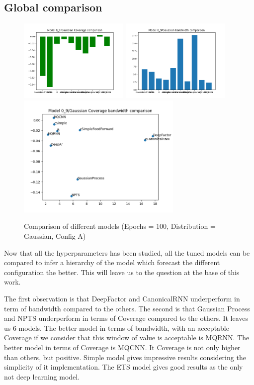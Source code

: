 \subsection{Global comparison}

\begin{figure}[H]
    \centering
    \includegraphics[width=200px]{plots/hist/a/model/0_9/Gaussian/Coverage.png}
    \includegraphics[width=200px]{plots/hist/a/model/0_9/Gaussian/bandwidth.png}
    \includegraphics[width=300px]{plots/scatter/a/model/0_9/Gaussian/Coverage_bandwidth.png}
    \caption{Comparison of different models (Epochs = 100, Distribution = Gaussian, Config A)}
    \label{fig:comp2_mqcnn}
\end{figure}

Now that all the hyperparameters has been studied, all the tuned models can be compared to infer a hierarchy of the model which forecast the different configuration the better. This will leave us to the question at the base of this work.

The first observation is that DeepFactor and CanonicalRNN underperform in term of bandwidth compared to the others.
The second is that Gaussian Process and NPTS underperform in terms of Coverage compared to the others.
It leaves us 6 models.
The better model in terms of bandwidth, with an acceptable Coverage if we consider that this window of value is acceptable is MQRNN.
The better model in terms of Coverage is MQCNN. It Coverage is not only higher than others, but positive. 
Simple model gives impressive results considering the simplicity of it implementation.
The ETS model gives good results as the only not deep learning model.